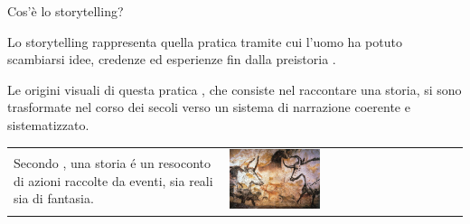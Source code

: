 \documentclass{beamer}
\begin{document}
\begin{frame}{\centerline{Cos'è lo storytelling?}}

Lo storytelling rappresenta quella pratica tramite cui l'uomo ha potuto scambiarsi idee, credenze ed esperienze fin dalla preistoria .

   \vspace{0.5cm}
   
Le origini visuali di questa pratica \cite{feliks2011prehistory}, che consiste nel raccontare una storia, si sono trasformate nel corso dei secoli verso un sistema di narrazione coerente e sistematizzato. 

      \vspace{0.5cm}
      
      \begin{table}[H]
  \begin{tabulary}{\textwidth}{m{5.5cm} m{5.5cm}}
        Secondo \citeauthor{Ciriello2017ProtoStory}, una storia \'e un resoconto di azioni raccolte da eventi, sia reali sia di fantasia. & \includegraphics[width=0.4\textwidth]{images/img-1.jpg} \\
    \end{tabulary}
    \end{table}


\end{frame}
\end{document}
